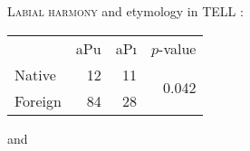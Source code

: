  
\citet{Inkelas2001}

\ex \textsc{Labial harmony} and etymology in TELL \citep[][187]{Inkelas2001}: \vspace{6pt} \\
\begin{tabular}{l r r r}
        & aPu & aPı & $p$-value \\
Native  & 12  & 11  & \multirow{2}{*}{0.042} \\
Foreign & 84  & 28  \\
\end{tabular}
\xe 

\citet{NiChiosain1993} and \citet{Ito1995b} 
